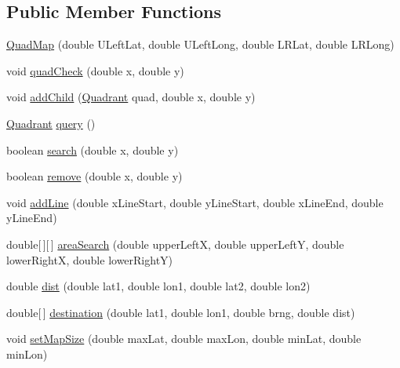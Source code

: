 \subsection*{Public Member Functions}
\begin{DoxyCompactItemize}
\item 
\hyperlink{classrob_o_s2_1_1mapping_1_1quad_map_1_1_quad_map_a0c90cc570e08c5466a6e86684ba1516a}{QuadMap} (double ULeftLat, double ULeftLong, double LRLat, double LRLong)
\item 
void \hyperlink{classrob_o_s2_1_1mapping_1_1quad_map_1_1_quad_map_aaeb79b6d8ef9496dcab9c0da5f15e9a5}{quadCheck} (double x, double y)
\item 
void \hyperlink{classrob_o_s2_1_1mapping_1_1quad_map_1_1_quad_map_a1532b5de71e516d72d6d32d26336526e}{addChild} (\hyperlink{classrob_o_s2_1_1mapping_1_1quad_map_1_1_quadrant}{Quadrant} quad, double x, double y)
\item 
\hyperlink{classrob_o_s2_1_1mapping_1_1quad_map_1_1_quadrant}{Quadrant} \hyperlink{classrob_o_s2_1_1mapping_1_1quad_map_1_1_quad_map_a9d6cf8f6d5192b7d8e7158a1b944baf5}{query} ()
\item 
boolean \hyperlink{classrob_o_s2_1_1mapping_1_1quad_map_1_1_quad_map_aa0313111814fd3b51ca3c34066c072fe}{search} (double x, double y)
\item 
boolean \hyperlink{classrob_o_s2_1_1mapping_1_1quad_map_1_1_quad_map_ad8d19b03ecf80e93eb1fed8138298920}{remove} (double x, double y)
\item 
void \hyperlink{classrob_o_s2_1_1mapping_1_1quad_map_1_1_quad_map_a7502115c7bdc0b6a6ecdace22e68c7c9}{addLine} (double xLineStart, double yLineStart, double xLineEnd, double yLineEnd)
\item 
double\mbox{[}$\,$\mbox{]}\mbox{[}$\,$\mbox{]} \hyperlink{classrob_o_s2_1_1mapping_1_1quad_map_1_1_quad_map_a7bd398c8bb3243a349f6d0a258a6e540}{areaSearch} (double upperLeftX, double upperLeftY, double lowerRightX, double lowerRightY)
\item 
double \hyperlink{classrob_o_s2_1_1mapping_1_1quad_map_1_1_quad_map_a78652ee3190b887e50a57b59fd6cb74b}{dist} (double lat1, double lon1, double lat2, double lon2)
\item 
double\mbox{[}$\,$\mbox{]} \hyperlink{classrob_o_s2_1_1mapping_1_1quad_map_1_1_quad_map_a1f0463534bde99838b34c265c09cfcad}{destination} (double lat1, double lon1, double brng, double dist)
\item 
void \hyperlink{classrob_o_s2_1_1mapping_1_1quad_map_1_1_quad_map_a476ae9d095ccccdffd69ac13f0e1e9d0}{setMapSize} (double maxLat, double maxLon, double minLat, double minLon)

\end{DoxyCompactItemize}
